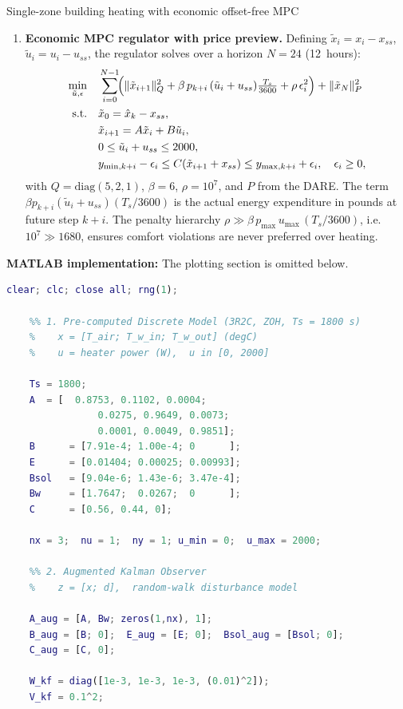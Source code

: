\begin{examplebox}{Single-zone building heating with economic offset-free MPC}
\begin{enumerate}
	\item \textbf{Economic MPC regulator with price preview.}
	Defining $\tilde x_i = x_i - x_{ss}$, $\tilde u_i = u_i - u_{ss}$,
	the regulator solves over a horizon $N=24$ (12~hours):
	\begin{align*}
		\min_{\tilde u,\epsilon} \quad &
		\sum_{i=0}^{N-1}\!\Bigl(
		\|\tilde x_{i+1}\|_Q^2
		+\beta\,p_{k+i}\,(\tilde u_i+u_{ss})\tfrac{T_s}{3600}
		+\rho\,\epsilon_i^2
		\Bigr) + \|\tilde x_N\|_P^2 \\
		\text{s.t.} \quad
		& \tilde x_0 = \hat x_k - x_{ss}, \\
		& \tilde x_{i+1} = A\tilde x_i + B\tilde u_i, \\
		& 0 \le \tilde u_i + u_{ss} \le 2000, \\
		& y_{\min,k+i}-\epsilon_i \le C(\tilde x_{i+1}+x_{ss}) \le y_{\max,k+i}+\epsilon_i,
		\quad \epsilon_i\ge 0,
	\end{align*}
	with $Q=\mathrm{diag}(5,2,1)$, $\beta=6$, $\rho=10^7$, and
	$P$ from the DARE.
	The term $\beta p_{k+i}(\tilde u_i+u_{ss})(T_s/3600)$ is the actual
	energy expenditure in pounds at future step $k+i$.
	The penalty hierarchy
	$\rho \gg \beta\,p_{\max}\,u_{\max}\,(T_s/3600)$,
	i.e.\ $10^7 \gg 1680$, ensures comfort violations are never
	preferred over heating.
\end{enumerate}

\textbf{MATLAB implementation:} The plotting section is omitted below.

\begin{lstlisting}[language=MATLAB]
	clear; clc; close all; rng(1);
	
	%% 1. Pre-computed Discrete Model (3R2C, ZOH, Ts = 1800 s)
	%    x = [T_air; T_w_in; T_w_out] (degC)
	%    u = heater power (W),  u in [0, 2000]

	Ts = 1800;
	A  = [	0.8753, 0.1102, 0.0004;
				0.0275, 0.9649, 0.0073;
				0.0001, 0.0049, 0.9851];
	B      = [7.91e-4; 1.00e-4; 0      ];
	E      = [0.01404; 0.00025; 0.00993];   
	Bsol   = [9.04e-6; 1.43e-6; 3.47e-4];  
	Bw     = [1.7647;  0.0267;  0      ];   
	C      = [0.56, 0.44, 0];               
	
	nx = 3;  nu = 1;  ny = 1; u_min = 0;  u_max = 2000;
	
	%% 2. Augmented Kalman Observer
	%    z = [x; d],  random-walk disturbance model
	
	A_aug = [A, Bw; zeros(1,nx), 1];
	B_aug = [B; 0];  E_aug = [E; 0];  Bsol_aug = [Bsol; 0];
	C_aug = [C, 0];
	
	W_kf = diag([1e-3, 1e-3, 1e-3, (0.01)^2]);  
	V_kf = 0.1^2;
	

\end{lstlisting}
\end{examplebox}
